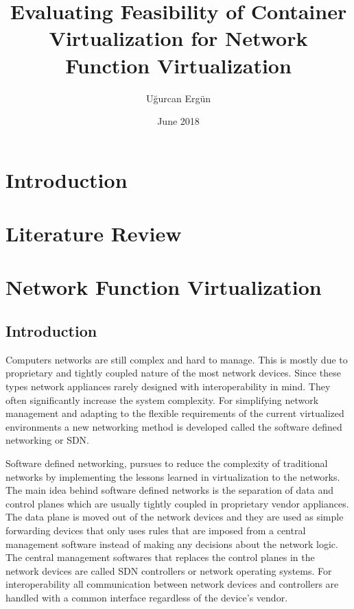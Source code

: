 \documentclass[12pt,oneandhalf,chaparabic,ceng,ms,eng,oneside,pntc]{gsufbe}
\author{Uğurcan Ergün}
\title{Evaluating Feasibility of Container Virtualization for Network Function Virtualization}
\date{June 2018}
\begin{document}
\addtolength{\textheight}{1.5cm}
\newlength\myindent
\setlength\myindent{6em}
\newcommand\bindent{%
  \begingroup
  \setlength{\itemindent}{\myindent}
  \addtolength{\algorithmicindent}{\myindent}
}
\newcommand\eindent{\endgroup}
\begin{preliminaries}
%
\end{preliminaries}
%
%
%
\newtheorem{thm}{Definition}[chapter]
\renewcommand{\thethm}{\arabic{chapter}.\arabic{thm}}
\newtheorem{prp}{Proposition}[chapter]
\renewcommand{\theprp}{\arabic{chapter}.\arabic{prp}}
\newenvironment{prf}{\noindent{\bf Proof}}{$\hfill \Box$ \vspace{10pt}}

\chapter{Introduction}

\chapter{Literature Review}

\chapter{Network Function Virtualization}
\section{Introduction}
Computers networks are still complex and hard to manage. This is mostly due to proprietary and tightly
coupled nature of the most network devices. Since these types network appliances rarely designed with
interoperability in mind. They often significantly increase the system complexity. For simplifying
network management and adapting to the flexible requirements of the current virtualized environments a
new networking method is developed called the software defined networking or SDN.

Software defined networking, pursues to reduce the complexity of traditional networks by implementing 
the lessons learned in virtualization to the networks. The main idea behind software defined networks
is the separation of data and control planes which are usually tightly coupled in proprietary vendor
appliances. The data plane is moved out of the network devices and they are used as simple forwarding
devices that only uses rules that are imposed from a central management software instead of making any
decisions about the network logic. The central management softwares that replaces the control planes in
the network devices are called SDN controllers or network operating systems. For interoperability all
communication between network devices and controllers are handled with a common interface regardless of
the device's vendor.
\end{document}
